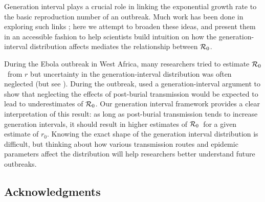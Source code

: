 \documentclass[12pt,]{article}
\newcommand{\RR}{\ensuremath{{\cal R}}}
\newcommand{\Rx}[1]{\ensuremath{{\cal R}_{#1}}}
\newcommand{\Ro}{\Rx{0}}
\begin{document}

Generation interval plays a crucial role in linking the exponential growth rate to the basic reproduction number of an outbreak.
Much work has been done in exploring such links \cite{WallLips07,Sven07,Sven15,Nish10};
here we attempt to broaden these ideas, and present them in an accessible fashion to help scientists build intuition on how the generation-interval distribution affects mediates the relationship between \Ro.

During the Ebola outbreak in West Africa, many researchers tried to estimate \Ro\ from $r$ \cite{Alth14, AylwBarb14, Others_p, KingDome15} but uncertainty in the generation-interval distribution was often neglected (but see \cite{TaylDush16}).  
During the outbreak, \cite{WeitDush15} used a generation-interval argument to  show that neglecting the effects of post-burial transmission would be expected to lead to underestimates of \Ro.
Our generation interval framework provides a clear interpretation of this result: as long as post-burial transmission tends to increase generation intervals, it should result in higher estimates of \Ro\ for a given estimate of $r_0$.
Knowing the exact shape of the generation interval distribution is difficult, but thinking about how various transmission routes and epidemic parameters affect the distribution will help researchers better understand future outbreaks.

\subsection*{Acknowledgments}

\printbibliography
\end{document}
